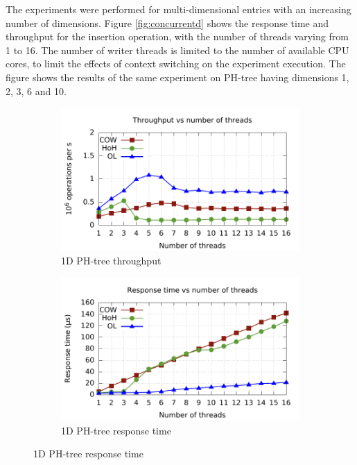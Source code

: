 \documentclass[11pt,a4paper]{globis-book}
\begin{document}
The experiments were performed for multi-dimensional entries with an increasing number of dimensions. Figure \ref{fig:concurrentd} shows the response time and throughput for the insertion operation, with the number of threads varying from 1 to 16. The number of writer threads is limited to the number of available CPU cores, to limit the effects of context switching on the experiment execution. The figure shows the results of the same experiment on PH-tree having dimensions 1, 2, 3, 6 and 10.  

\begin{figure}
    \centering
    \begin{subfigure}[b]{0.5\linewidth}
        \includegraphics[scale=0.5]{images/plots/insert1d-tp}
        \caption{1D PH-tree throughput}
    \end{subfigure}%
    \begin{subfigure}[b]{0.5\linewidth}
        \includegraphics[scale=0.5]{images/plots/insert1d-rt}
        \caption{1D PH-tree response time}
    \end{subfigure}

\end{figure}
\end{document}
